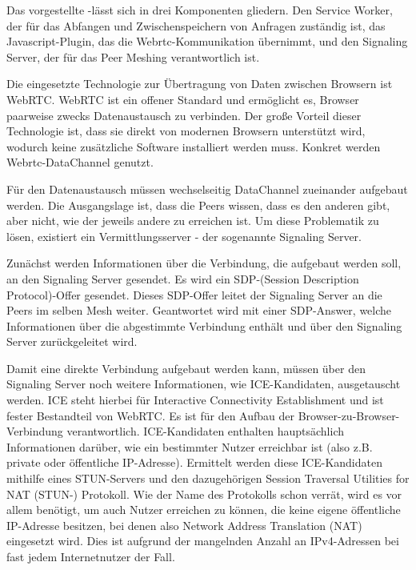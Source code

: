 Das vorgestellte \pTp-\cdn lässt sich in drei Komponenten gliedern. Den Service Worker, der für das Abfangen und Zwischenspeichern von Anfragen zuständig ist, das Javascript-Plugin, das die Webrtc-Kommunikation übernimmt, und den Signaling Server, der für das Peer Meshing verantwortlich ist.

Die eingesetzte Technologie zur Übertragung von Daten zwischen Browsern ist WebRTC. WebRTC ist ein offener Standard und ermöglicht es, Browser paarweise zwecks Datenaustausch zu verbinden. Der große Vorteil dieser Technologie ist, dass sie direkt von modernen Browsern unterstützt wird, wodurch keine zusätzliche Software installiert werden muss. Konkret werden Webrtc-DataChannel genutzt.

Für den Datenaustausch müssen wechselseitig DataChannel zueinander aufgebaut werden. Die Ausgangslage ist, dass die Peers wissen, dass es den anderen gibt, aber nicht, wie der jeweils andere zu erreichen ist. Um diese Problematik zu lösen, existiert ein Vermittlungsserver - der sogenannte Signaling Server.

Zunächst werden Informationen über die Verbindung, die aufgebaut werden soll, an den Signaling Server gesendet. Es wird ein SDP-(Session Description Protocol)-Offer gesendet. Dieses SDP-Offer leitet der Signaling Server an die Peers im selben Mesh weiter. Geantwortet wird mit einer SDP-Answer, welche Informationen über die abgestimmte Verbindung enthält und über den Signaling Server zurückgeleitet wird.

Damit eine direkte Verbindung aufgebaut werden kann, müssen über den Signaling Server noch weitere Informationen, wie ICE-Kandidaten, ausgetauscht werden. ICE steht hierbei für Interactive Connectivity Establishment und ist fester Bestandteil von WebRTC. Es ist für den Aufbau der Browser-zu-Browser-Verbindung verantwortlich. ICE-Kandidaten enthalten hauptsächlich Informationen darüber, wie ein bestimmter Nutzer erreichbar ist (also z.B. private oder öffentliche IP-Adresse). Ermittelt werden diese ICE-Kandidaten mithilfe eines STUN-Servers und den dazugehörigen Session Traversal Utilities for NAT (STUN-) Protokoll. Wie der Name des Protokolls schon verrät, wird es vor allem benötigt, um auch Nutzer erreichen zu können, die keine eigene öffentliche IP-Adresse besitzen, bei denen also Network Address Translation (NAT) eingesetzt wird. Dies ist aufgrund der mangelnden Anzahl an IPv4-Adressen bei fast jedem Internetnutzer der Fall.

